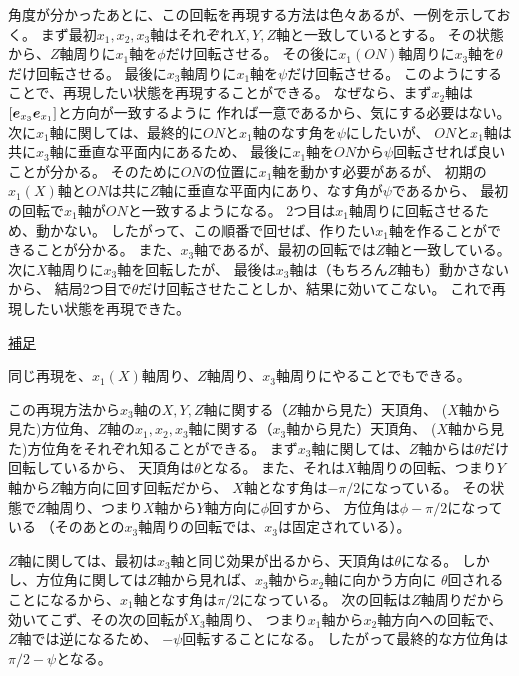 \documentclass[a4paper]{jsarticle}
\def\vec#1{\mbox{\boldmath $#1$}}
\begin{document}
角度が分かったあとに、この回転を再現する方法は色々あるが、一例を示しておく。
まず最初$x_1, x_2, x_3$軸はそれぞれ$X, Y, Z$軸と一致しているとする。
その状態から、$Z$軸周りに$x_1$軸を$\phi$だけ回転させる。
その後に$x_1(ON)$軸周りに$x_3$軸を$\theta$だけ回転させる。
最後に$x_3$軸周りに$x_1$軸を$\psi$だけ回転させる。
このようにすることで、再現したい状態を再現することができる。
なぜなら、まず$x_2$軸は$[\vec{e}_{x_3} \vec{e}_{x_1}]$と方向が一致するように
作れば一意であるから、気にする必要はない。
次に$x_1$軸に関しては、最終的に$ON$と$x_1$軸のなす角を$\psi$にしたいが、
$ON$と$x_1$軸は共に$x_3$軸に垂直な平面内にあるため、
最後に$x_1$軸を$ON$から$\psi$回転させれば良いことが分かる。
そのために$ON$の位置に$x_1$軸を動かす必要があるが、
初期の$x_1(X)$軸と$ON$は共に$Z$軸に垂直な平面内にあり、なす角が$\psi$であるから、
最初の回転で$x_1$軸が$ON$と一致するようになる。
2つ目は$x_1$軸周りに回転させるため、動かない。
したがって、この順番で回せば、作りたい$x_1$軸を作ることができることが分かる。
また、$x_3$軸であるが、最初の回転では$Z$軸と一致している。
次に$X$軸周りに$x_3$軸を回転したが、
最後は$x_3$軸は（もちろん$Z$軸も）動かさないから、
結局2つ目で$\theta$だけ回転させたことしか、結果に効いてこない。
これで再現したい状態を再現できた。

\begin{screen}
	\underline{補足}

	同じ再現を、$x_1(X)$軸周り、$Z$軸周り、$x_3$軸周りにやることでもできる。

	この再現方法から$x_3$軸の$X, Y, Z$軸に関する（$Z$軸から見た）天頂角、
	($X$軸から見た)方位角、$Z$軸の$x_1, x_2, x_3$軸に関する（$x_3$軸から見た）天頂角、
	($X$軸から見た)方位角をそれぞれ知ることができる。
	まず$x_3$軸に関しては、$Z$軸からは$\theta$だけ回転しているから、
	天頂角は$\theta$となる。
	また、それは$X$軸周りの回転、つまり$Y$軸から$Z$軸方向に回す回転だから、
	$X$軸となす角は$-\pi/2$になっている。
	その状態で$Z$軸周り、つまり$X$軸から$Y$軸方向に$\phi$回すから、
	方位角は$\phi - \pi/2$になっている
	（そのあとの$x_3$軸周りの回転では、$x_3$は固定されている）。

	$Z$軸に関しては、最初は$x_3$軸と同じ効果が出るから、天頂角は$\theta$になる。
	しかし、方位角に関しては$Z$軸から見れば、$x_3$軸から$x_2$軸に向かう方向に
	$\theta$回されることになるから、$x_1$軸となす角は$\pi/2$になっている。
	次の回転は$Z$軸周りだから効いてこず、その次の回転が$X_3$軸周り、
	つまり$x_1$軸から$x_2$軸方向への回転で、$Z$軸では逆になるため、
	$-\psi$回転することになる。
	したがって最終的な方位角は$\pi/2 - \psi$となる。
\end{screen}
\end{document}
